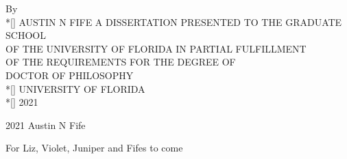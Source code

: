 \documentclass{ufdissertation}[overrideChapters] %
\begin{document}
\docBodyfalse
    \begin{center}
        \thispagestyle{empty}%
        \vspace*{-0.4in}%
        \vfill%
        By \\*[\baselineskip]%
        \MakeUppercase{Austin N Fife}%
        \vfill%
        A \MakeUppercase{Dissertation} PRESENTED TO THE GRADUATE SCHOOL \\%
        OF THE UNIVERSITY OF FLORIDA IN PARTIAL FULFILLMENT \\%
        OF THE REQUIREMENTS FOR THE DEGREE OF \\%
        \MakeUppercase{Doctor of Philosophy} \\*[\baselineskip]%
        UNIVERSITY OF FLORIDA \\*[\baselineskip]%
        {2021}%
    \end{center}
    \newpage

    \newpage
      \vspace*{\fill}
        \begin{center}
            \textcopyright{} {2021} {Austin N Fife}
        \end{center}
      \vspace*{\fill}
    \newpage

\setcounter{secnumdepth}{-1}     %
                                 


    \vspace*{\fill}               %
\begin{center}                    %
  \realSingleSpace
  {For Liz, Violet, Juniper and Fifes to come}
\end{center}
\vspace*{\fill}                   %
\end{document}
